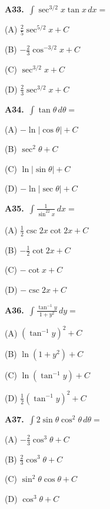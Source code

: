 \documentclass[11pt]{article}
\begin{document}
\bigskip\noindent\textbf{A33.}\ $\displaystyle\int \sec^{3/2}x\tan x\,dx=$
\begin{list}{}{\setlength{\leftmargin}{3em}\setlength{\labelwidth}{2.5em}\setlength{\itemsep}{0pt}\setlength{\topsep}{2pt}}
\item[(A)] $\frac25\sec^{5/2}x+C$
\item[(B)] $-\frac23\cos^{-3/2}x+C$
\item[(C)] $\sec^{3/2}x+C$
\item[(D)] $\frac23\sec^{3/2}x+C$
\end{list}

\bigskip\noindent\textbf{A34.}\ $\displaystyle\int \tan\theta\,d\theta=$
\begin{list}{}{\setlength{\leftmargin}{3em}\setlength{\labelwidth}{2.5em}\setlength{\itemsep}{0pt}\setlength{\topsep}{2pt}}
\item[(A)] $-\ln\lvert\cos\theta\rvert+C$
\item[(B)] $\sec^2\theta+C$
\item[(C)] $\ln\lvert\sin\theta\rvert+C$
\item[(D)] $-\ln\lvert\sec\theta\rvert+C$
\end{list}

\bigskip\noindent\textbf{A35.}\ $\displaystyle\int \frac1{\sin^22x}\,dx=$
\begin{list}{}{\setlength{\leftmargin}{3em}\setlength{\labelwidth}{2.5em}\setlength{\itemsep}{0pt}\setlength{\topsep}{2pt}}
\item[(A)] $\frac12\csc2x\cot2x+C$
\item[(B)] $-\frac12\cot2x+C$
\item[(C)] $-\cot x+C$
\item[(D)] $-\csc2x+C$
\end{list}

\bigskip\noindent\textbf{A36.}\ $\displaystyle\int \frac{\tan^{-1}y}{1+y^2}\,dy=$
\begin{list}{}{\setlength{\leftmargin}{3em}\setlength{\labelwidth}{2.5em}\setlength{\itemsep}{0pt}\setlength{\topsep}{2pt}}
\item[(A)] $(\tan^{-1}y)^2+C$
\item[(B)] $\ln(1+y^2)+C$
\item[(C)] $\ln(\tan^{-1}y)+C$
\item[(D)] $\frac12(\tan^{-1}y)^2+C$
\end{list}

\bigskip\noindent\textbf{A37.}\ $\displaystyle\int 2\sin\theta\cos^2\theta\,d\theta=$
\begin{list}{}{\setlength{\leftmargin}{3em}\setlength{\labelwidth}{2.5em}\setlength{\itemsep}{0pt}\setlength{\topsep}{2pt}}
\item[(A)] $-\frac23\cos^3\theta+C$
\item[(B)] $\frac23\cos^3\theta+C$
\item[(C)] $\sin^2\theta\cos\theta+C$
\item[(D)] $\cos^3\theta+C$
\end{list}
\end{document}
